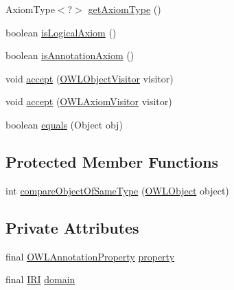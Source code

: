 \begin{DoxyCompactItemize}
\item 
Axiom\-Type$<$?$>$ \hyperlink{classuk_1_1ac_1_1manchester_1_1cs_1_1owl_1_1owlapi_1_1_o_w_l_annotation_property_domain_axiom_impl_a2e881c144eb3eec11a737affb98a7667}{get\-Axiom\-Type} ()
\item 
boolean \hyperlink{classuk_1_1ac_1_1manchester_1_1cs_1_1owl_1_1owlapi_1_1_o_w_l_annotation_property_domain_axiom_impl_a8358783b54752de8d28e3c16a46365c8}{is\-Logical\-Axiom} ()
\item 
boolean \hyperlink{classuk_1_1ac_1_1manchester_1_1cs_1_1owl_1_1owlapi_1_1_o_w_l_annotation_property_domain_axiom_impl_a807f9bef0fe93a32a426389774a643ae}{is\-Annotation\-Axiom} ()
\item 
void \hyperlink{classuk_1_1ac_1_1manchester_1_1cs_1_1owl_1_1owlapi_1_1_o_w_l_annotation_property_domain_axiom_impl_a4aefb1cf8f1f91db839877b8d5b5e791}{accept} (\hyperlink{interfaceorg_1_1semanticweb_1_1owlapi_1_1model_1_1_o_w_l_object_visitor}{O\-W\-L\-Object\-Visitor} visitor)
\item 
void \hyperlink{classuk_1_1ac_1_1manchester_1_1cs_1_1owl_1_1owlapi_1_1_o_w_l_annotation_property_domain_axiom_impl_a6a9e345ff6e72573041bd320bdca7271}{accept} (\hyperlink{interfaceorg_1_1semanticweb_1_1owlapi_1_1model_1_1_o_w_l_axiom_visitor}{O\-W\-L\-Axiom\-Visitor} visitor)
\item 
boolean \hyperlink{classuk_1_1ac_1_1manchester_1_1cs_1_1owl_1_1owlapi_1_1_o_w_l_annotation_property_domain_axiom_impl_a052bd68e8cab4832d32f7ad8b39465ae}{equals} (Object obj)
\end{DoxyCompactItemize}
\subsection*{Protected Member Functions}
\begin{DoxyCompactItemize}
\item 
int \hyperlink{classuk_1_1ac_1_1manchester_1_1cs_1_1owl_1_1owlapi_1_1_o_w_l_annotation_property_domain_axiom_impl_ac34f9c5988ae9bd9eeb0564d284767ea}{compare\-Object\-Of\-Same\-Type} (\hyperlink{interfaceorg_1_1semanticweb_1_1owlapi_1_1model_1_1_o_w_l_object}{O\-W\-L\-Object} object)
\end{DoxyCompactItemize}
\subsection*{Private Attributes}
\begin{DoxyCompactItemize}
\item 
final \hyperlink{interfaceorg_1_1semanticweb_1_1owlapi_1_1model_1_1_o_w_l_annotation_property}{O\-W\-L\-Annotation\-Property} \hyperlink{classuk_1_1ac_1_1manchester_1_1cs_1_1owl_1_1owlapi_1_1_o_w_l_annotation_property_domain_axiom_impl_a09f1227e113575b3d4caf8e2e700401a}{property}
\item 
final \hyperlink{classorg_1_1semanticweb_1_1owlapi_1_1model_1_1_i_r_i}{I\-R\-I} \hyperlink{classuk_1_1ac_1_1manchester_1_1cs_1_1owl_1_1owlapi_1_1_o_w_l_annotation_property_domain_axiom_impl_a8e9b6660c1ae48f283b2f0baf7ad04ac}{domain}
\end{DoxyCompactItemize}

